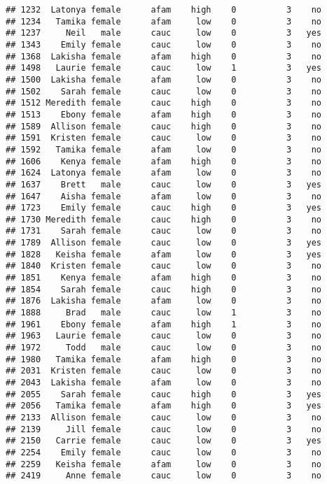 \documentclass[
]{article}
\begin{document}
\begin{verbatim}
## 1232  Latonya female      afam    high    0          3    no
## 1234   Tamika female      afam     low    0          3    no
## 1237     Neil   male      cauc     low    0          3   yes
## 1343    Emily female      cauc     low    0          3    no
## 1368  Lakisha female      afam    high    0          3    no
## 1498   Laurie female      cauc     low    1          3   yes
## 1500  Lakisha female      afam     low    0          3    no
## 1502    Sarah female      cauc     low    0          3    no
## 1512 Meredith female      cauc    high    0          3    no
## 1513    Ebony female      afam    high    0          3    no
## 1589  Allison female      cauc    high    0          3    no
## 1591  Kristen female      cauc     low    0          3    no
## 1592   Tamika female      afam     low    0          3    no
## 1606    Kenya female      afam    high    0          3    no
## 1624  Latonya female      afam     low    0          3    no
## 1637    Brett   male      cauc     low    0          3   yes
## 1647    Aisha female      afam     low    0          3    no
## 1723    Emily female      cauc    high    0          3   yes
## 1730 Meredith female      cauc    high    0          3    no
## 1731    Sarah female      cauc     low    0          3    no
## 1789  Allison female      cauc     low    0          3   yes
## 1828   Keisha female      afam     low    0          3   yes
## 1840  Kristen female      cauc     low    0          3    no
## 1851    Kenya female      afam    high    0          3    no
## 1854    Sarah female      cauc    high    0          3    no
## 1876  Lakisha female      afam     low    0          3    no
## 1888     Brad   male      cauc     low    1          3    no
## 1961    Ebony female      afam    high    1          3    no
## 1963   Laurie female      cauc     low    0          3    no
## 1972     Todd   male      cauc     low    0          3    no
## 1980   Tamika female      afam    high    0          3    no
## 2031  Kristen female      cauc     low    0          3    no
## 2043  Lakisha female      afam     low    0          3    no
## 2055    Sarah female      cauc    high    0          3   yes
## 2056   Tamika female      afam    high    0          3   yes
## 2133  Allison female      cauc     low    0          3    no
## 2139     Jill female      cauc     low    0          3    no
## 2150   Carrie female      cauc     low    0          3   yes
## 2254    Emily female      cauc     low    0          3    no
## 2259   Keisha female      afam     low    0          3    no
## 2419     Anne female      cauc     low    0          3    no

\end{verbatim}
\end{document}
